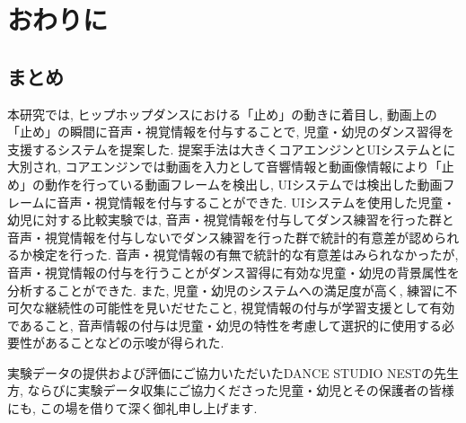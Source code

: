 \documentclass[technicalreport]{ieicej}
\begin{document}
\section{おわりに}
\subsection{まとめ}
本研究では, ヒップホップダンスにおける「止め」の動きに着目し, 動画上の「止め」の瞬間に音声・視覚情報を付与することで, 児童・幼児のダンス習得を支援するシステムを提案した. 提案手法は大きくコアエンジンとUIシステムとに大別され, コアエンジンでは動画を入力として音響情報と動画像情報により「止め」の動作を行っている動画フレームを検出し, UIシステムでは検出した動画フレームに音声・視覚情報を付与することができた. UIシステムを使用した児童・幼児に対する比較実験では, 音声・視覚情報を付与してダンス練習を行った群と音声・視覚情報を付与しないでダンス練習を行った群で統計的有意差が認められるか検定を行った. 音声・視覚情報の有無で統計的な有意差はみられなかったが, 音声・視覚情報の付与を行うことがダンス習得に有効な児童・幼児の背景属性を分析することができた. また, 児童・幼児のシステムへの満足度が高く, 練習に不可欠な継続性の可能性を見いだせたこと, 視覚情報の付与が学習支援として有効であること, 音声情報の付与は児童・幼児の特性を考慮して選択的に使用する必要性があることなどの示唆が得られた.

\ack %
実験データの提供および評価にご協力いただいたDANCE STUDIO NESTの先生方, ならびに実験データ収集にご協力くださった児童・幼児とその保護者の皆様にも, この場を借りて深く御礼申し上げます. 





\end{document}
